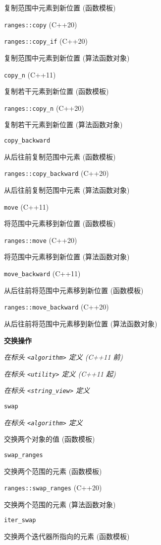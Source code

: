 复制范围中元素到新位置 (函数模板)

\noindent \lstinline{ranges::copy} (C++20)

\noindent \lstinline{ranges::copy_if} (C++20)

复制范围中元素到新位置 (算法函数对象)

\noindent \lstinline{copy_n} (C++11)

复制若⼲元素到新位置 (函数模板)

\noindent \lstinline{ranges::copy_n} (C++20)

复制若⼲元素到新位置 (算法函数对象)

\noindent \lstinline{copy_backward} 

从后往前复制范围中元素 (函数模板)

\noindent \lstinline{ranges::copy_backward} (C++20)

从后往前复制范围中元素 (算法函数对象)

\noindent \lstinline{move} (C++11)

将范围中元素移到新位置 (函数模板)

\noindent \lstinline{ranges::move} (C++20)

将范围中元素移到新位置 (算法函数对象)

\noindent \lstinline{move_backward} (C++11)

从后往前将范围中元素移到新位置 (函数模板)

\noindent \lstinline{ranges::move_backward} (C++20)

从后往前将范围中元素移到新位置 (算法函数对象)

\noindent \textbf{交换操作} 

\textit{在标头 \lstinline{<algorithm>} 定义 (C++11 前)}

\textit{在标头 \lstinline{<utility>} 定义 (C++11 起)}

\textit{在标头 \lstinline{<string_view>} 定义}

\noindent \lstinline{swap} 

\textit{在标头 \lstinline{<algorithm>} 定义}

交换两个对象的值 (函数模板)

\noindent \lstinline{swap_ranges} 

交换两个范围的元素 (函数模板)

\noindent \lstinline{ranges::swap_ranges} (C++20) 

交换两个范围的元素 (算法函数对象)

\noindent \lstinline{iter_swap} 

交换两个迭代器所指向的元素 (函数模板)

